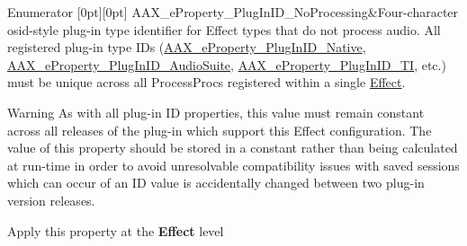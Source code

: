 \begin{DoxyEnumFields}{Enumerator}
[0pt][0pt]{}\mbox{\label{a00662_a13e384f22825afd3db6d68395b79ce0da699fa67ab37a566fbcb8fe08d6a3cf8b}} 
A\+A\+X\+\_\+e\+Property\+\_\+\+Plug\+In\+I\+D\+\_\+\+No\+Processing&Four-\/character osid-\/style plug-\/in type identifier for Effect types that do not process audio. All registered plug-\/in type I\+Ds (\mbox{\hyperlink{a00662_a13e384f22825afd3db6d68395b79ce0da89ca3dd6e96895cda14976c1b1ceb826}{A\+A\+X\+\_\+e\+Property\+\_\+\+Plug\+In\+I\+D\+\_\+\+Native}}, \mbox{\hyperlink{a00662_a13e384f22825afd3db6d68395b79ce0dad3344696b8298a8b254add3d039ea927}{A\+A\+X\+\_\+e\+Property\+\_\+\+Plug\+In\+I\+D\+\_\+\+Audio\+Suite}}, \mbox{\hyperlink{a00662_a13e384f22825afd3db6d68395b79ce0da75f174df4efbeca86eaada126c1d9214}{A\+A\+X\+\_\+e\+Property\+\_\+\+Plug\+In\+I\+D\+\_\+\+TI}}, etc.) must be unique across all Process\+Procs registered within a single \mbox{\hyperlink{a01813}{Effect}}.

\begin{DoxyWarning}{Warning}
As with all plug-\/in ID properties, this value must remain constant across all releases of the plug-\/in which support this Effect configuration. The value of this property should be stored in a constant rather than being calculated at run-\/time in order to avoid unresolvable compatibility issues with saved sessions which can occur of an ID value is accidentally changed between two plug-\/in version releases.
\end{DoxyWarning}
\begin{DoxyItemize}
\item Apply this property at the {\bfseries{Effect}} level \end{DoxyItemize}
\\
\hline


\end{DoxyEnumFields}

